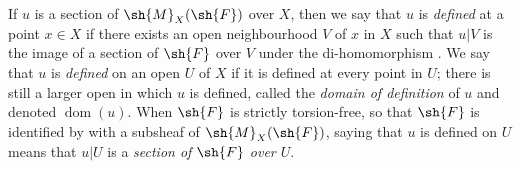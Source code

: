 \begin{env}[20.1.7]
\label{IV.20.1.7}
If $u$ is a section of $\sh{M}_X(\sh{F})$ over $X$, then we say that $u$ is \emph{defined} at a point $x\in X$ if there exists an open neighbourhood $V$ of $x$ in $X$ such that $u|V$ is the image of a section of $\sh{F}$ over $V$ under the di-homomorphism .
We say that $u$ is \emph{defined} on an open $U$ of $X$ if it is defined at every point in $U$;
there is still a larger open in which $u$ is defined, called the \emph{domain of definition} of $u$ and denoted $\operatorname{dom}(u)$.
When $\sh{F}$ is strictly torsion-free, so that $\sh{F}$ is identified by  with a subsheaf of $\sh{M}_X(\sh{F})$, saying that $u$ is defined on $U$ means that $u|U$ is a \emph{section of $\sh{F}$ over $U$}.
\end{env}

